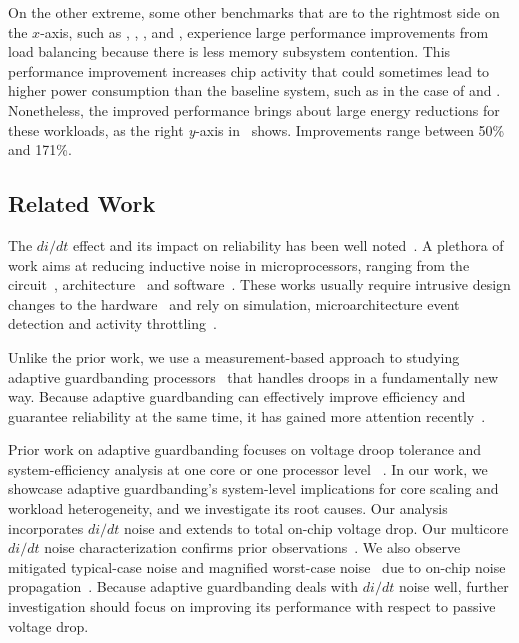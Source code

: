 On the other extreme, some other benchmarks that are to the rightmost side on the $x$-axis, such as , , ,  and , experience large performance improvements from load balancing because there is less memory subsystem contention. This performance improvement increases chip activity that could sometimes lead to higher power consumption than the baseline system, such as in the case of  and . Nonetheless, the improved performance brings about large energy reductions for these workloads, as the right \textit{y}-axis in~ shows. Improvements range between 50\% and 171\%.

\subsection{Related Work}
\label{sec:voltage:related}

The $di/dt$ effect and its impact on reliability has been well noted~\cite{james2007comparison,reddi2010voltage,kim2012audit,bertran2014voltage}. A plethora of work aims at reducing inductive noise in microprocessors, ranging from the circuit~\cite{ernst2003razor,blaauw2008razorii}, architecture~\cite{grochowski2002microarchitectural,powell2003pipeline,gupta2007understanding,gupta2008decor,gupta2009event,reddi2009voltage,reddi2010voltage,miller2012vrsync,zhang2014architecture} and software~\cite{reddi2010eliminating}. These works usually require intrusive design changes to the hardware~\cite{ernst2003razor,blaauw2008razorii,gupta2008decor,reddi2009voltage} and rely on simulation, microarchitecture event detection and activity throttling~\cite{grochowski2002microarchitectural,powell2003pipeline,gupta2009event,reddi2009voltage,reddi2010eliminating,miller2012vrsync}.

Unlike the prior work, we use a measurement-based approach to studying adaptive guardbanding processors~\cite{fischer200590nm,tschanz2007adaptive,kurd2008next,lefurgy2011active,bowman201222nm} that handles droops in a fundamentally new way. Because adaptive guardbanding can effectively improve efficiency and guarantee reliability at the same time, it has gained more attention recently~\cite{grenat20145,tokunaga20145,bowman20158}.

Prior work on adaptive guardbanding focuses on voltage droop tolerance and system-efficiency analysis at one core or one processor level ~\cite{fischer200590nm,tschanz2007adaptive,kurd2008next,lefurgy2011active,bowman201222nm,grenat20145,tokunaga20145,bowman20158}. In our work, we showcase adaptive guardbanding's system-level implications for core scaling and workload heterogeneity, and we investigate its root causes. Our analysis incorporates $di/dt$ noise and extends to total on-chip voltage drop. Our multicore $di/dt$ noise characterization confirms prior observations~\cite{gupta2007understanding,reddi2010voltage,miller2012vrsync}. We also observe mitigated typical-case noise and magnified worst-case noise~\cite{miller2012vrsync} due to on-chip noise propagation~\cite{gupta2007understanding,reddi2010voltage}. Because adaptive guardbanding deals with $di/dt$ noise well, further investigation should focus on improving its performance with respect to passive voltage drop.